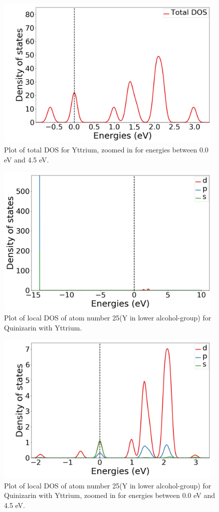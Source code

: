 \documentclass{article}
\begin{document}
  \begin{figure}[H]
      \centering
      \includegraphics[width = 11cm]{../fig/Y_TDOS_2.png}
      \caption{Plot of total DOS for Yttrium, zoomed in for energies between 0.0 eV and 4.5 eV. }
      \label{fig:Y_TDOS_2.png}
  \end{figure}

  \begin{figure}[H]
      \centering
      \includegraphics[width = 11cm]{../fig/Y_LDOS25_1.png}
      \caption{Plot of local DOS of atom number 25(Y in lower alcohol-group) for Quinizarin with Yttrium. }
      \label{fig:Y_LDOS25_1.png}
  \end{figure}

  \begin{figure}[H]
      \centering
      \includegraphics[width = 11cm]{../fig/Y_LDOS25_2.png}
      \caption{Plot of local DOS of atom number 25(Y in lower alcohol-group) for Quinizarin with Yttrium, zoomed in for energies between 0.0 eV and 4.5 eV. }
      \label{fig:Y_LDOS25_2.png}
  \end{figure}
\end{document}
